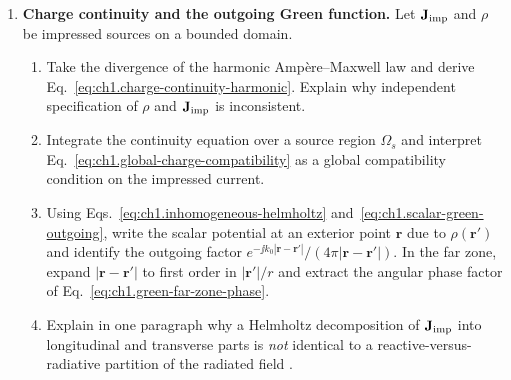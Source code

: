 \begin{enumerate}
\begin{enumerate}[label=(\alph*)]
\item Using $\Mavg=\mathbf{r}\times\Tavg$ and $\boldsymbol{\Phi}_{J,\mathrm{out}}=-\boldsymbol{\mathcal{T}}_J$ from section~\ref{sec:ch01.1.5}, show that $[\Mavg\cdot\hat{\mathbf{n}}]=\mathrm{N\,m^{-1}}$ on a sphere and that $[\boldsymbol{\Phi}_{J,\mathrm{out}}]=[\boldsymbol{\mathcal{T}}_J]=\mathrm{N\,m}=\mathrm{J}$. Relate the integrated flux to the cycle-averaged torque scale $\tau_{\hat{\mathbf{u}}}(V_{\mathrm{A}})$ in N\,m at harmonic steady state when storage on $V_{\mathrm{A}}$ is stationary \cite{beth1936,stratton1941}.
\end{enumerate}

\item \textbf{Charge continuity and the outgoing Green function.}
Let $\mathbf{J}_{\mathrm{imp}}$ and $\rho$ be impressed sources on a bounded domain.
\begin{enumerate}[label=(\alph*)]
\item Take the divergence of the harmonic Amp\`ere--Maxwell law and derive Eq.~\eqref{eq:ch1.charge-continuity-harmonic}. Explain why independent specification of $\rho$ and $\mathbf{J}_{\mathrm{imp}}$ is inconsistent.
\item Integrate the continuity equation over a source region $\Omega_s$ and interpret Eq.~\eqref{eq:ch1.global-charge-compatibility} as a global compatibility condition on the impressed current.
\item Using Eqs.~\eqref{eq:ch1.inhomogeneous-helmholtz} and~\eqref{eq:ch1.scalar-green-outgoing}, write the scalar potential at an exterior point $\mathbf{r}$ due to $\rho(\mathbf{r}')$ and identify the outgoing factor $e^{-\jj k_0|\mathbf{r}-\mathbf{r}'|}/(4\pi|\mathbf{r}-\mathbf{r}'|)$. In the far zone, expand $|\mathbf{r}-\mathbf{r}'|$ to first order in $|\mathbf{r}'|/r$ and extract the angular phase factor of Eq.~\eqref{eq:ch1.green-far-zone-phase}.
\item Explain in one paragraph why a Helmholtz decomposition of $\mathbf{J}_{\mathrm{imp}}$ into longitudinal and transverse parts is \emph{not} identical to a reactive-versus-radiative partition of the radiated field \cite{stratton1941,jackson1999}.
\end{enumerate}


\end{enumerate}
